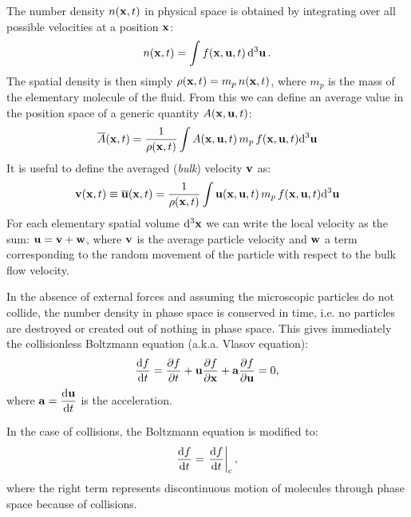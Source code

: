 The number density $n(\boldsymbol{\mathbf{x}}, t)$ in physical space is obtained by integrating over all possible velocities at a position $\boldsymbol{\mathbf{x}}$:
\begin{equation}
n(\boldsymbol{\mathbf{x}}, t ) = \int f(\boldsymbol{\mathbf{x}}, \boldsymbol{\mathbf{u}}, t) \dd[3]{\boldsymbol{\mathbf{u}}}.
\end{equation}
The spatial density is then simply $\rho(\boldsymbol{\mathbf{x}}, t) = m_p\,n(\boldsymbol{\mathbf{x}}, t)$, where $m_p$ is the mass of the elementary molecule of the fluid.
From this we can define an average value in the position space of a generic quantity $A(\boldsymbol{\mathbf{x}}, \boldsymbol{\mathbf{u}}, t)$:
\begin{equation}
 \label{eq:df_average}
 \overline{A} (\boldsymbol{\mathbf{x}}, t) = \frac{1}{\rho(\boldsymbol{\mathbf{x}}, t)}\int{A(\boldsymbol{\mathbf{x}}, \boldsymbol{\mathbf{u}}, t)\, m_p\, f(\boldsymbol{\mathbf{x}}, \boldsymbol{\mathbf{u}}, t) \dd[3] \boldsymbol{\mathbf{u}}}
\end{equation}
It is useful to define the averaged (\emph{bulk}) velocity $\boldsymbol{\mathbf{v}}$ as:
\begin{equation}
  \boldsymbol{\mathbf{v}}(\boldsymbol{\mathbf{x}}, t) \equiv \overline{\boldsymbol{\mathbf{u}}}(\boldsymbol{\mathbf{x}}, t) = \frac{1}{\rho(\boldsymbol{\mathbf{x}}, t)}\int{\boldsymbol{\mathbf{u}}(\boldsymbol{\mathbf{x}}, \boldsymbol{\mathbf{u}}, t)\, m_p\, f(\boldsymbol{\mathbf{x}}, \boldsymbol{\mathbf{u}}, t) \dd[3] \boldsymbol{\mathbf{u}}}
\end{equation}
For each elementary spatial volume $\dd[3] \boldsymbol{\mathbf{x}}$ we can write the local velocity as the sum: $\boldsymbol{\mathbf{u}} = \boldsymbol{\mathbf{v}} + \boldsymbol{\mathbf{w}}$, where $\boldsymbol{\mathbf{v}}$ is the average particle velocity and $\boldsymbol{\mathbf{w}}$ a term corresponding to the random movement of the particle with respect to the bulk flow velocity.

In the absence of external forces and assuming the microscopic particles do not collide, the number density in phase space is conserved in time, i.e. no particles are destroyed or created out of nothing in phase space.
This gives immediately the collisionless Boltzmann equation (a.k.a. Vlasov equation):
\begin{equation}
\label{eq:vlasov}
\dv{f}{t}(\boldsymbol{\mathbf{x}}, \boldsymbol{\mathbf{u}}, t) = \pdv{f}{t} + \boldsymbol{\mathbf{u}} \pdv{f}{\boldsymbol{\mathbf{x}}} + \boldsymbol{\mathbf{a}} \pdv{f}{\boldsymbol{\mathbf{u}}} = 0,
\end{equation}
where $\displaystyle \boldsymbol{\mathbf{a}} = \dv{\boldsymbol{\mathbf{u}}}{t}$ is the acceleration.

In the case of collisions, the Boltzmann equation is modified to:
\begin{equation}
\label{eq:boltzmann}
\dv{f}{t}(\boldsymbol{\mathbf{x}}, \boldsymbol{\mathbf{u}}, t) = \left.\dv{f}{t}\right|_c,
\end{equation}
where the right term represents discontinuous motion of molecules through phase space because of collisions.

